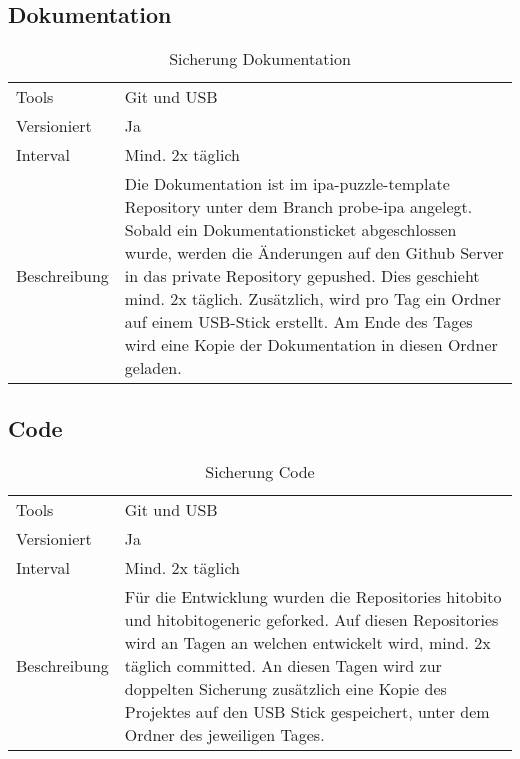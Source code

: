 \subsection{Dokumentation}
\begin{table}[h!]
    \begin{tabular}{|L{0.4\textwidth}|L{0.5\textwidth}|}
        \hline
          \\[12pt]
        \hline
        Tools & Git und USB \\
        \hline
        Versioniert & Ja \\
        \hline
        Interval & Mind. 2x täglich \\
        \hline
        Beschreibung & Die Dokumentation ist im ipa-puzzle-template Repository unter dem Branch probe-ipa angelegt.
        Sobald ein Dokumentationsticket abgeschlossen wurde, werden die Änderungen auf den Github Server in das private Repository
        gepushed. Dies geschieht mind. 2x täglich. Zusätzlich, wird pro Tag ein Ordner auf einem USB-Stick erstellt.  Am Ende des Tages wird eine Kopie der Dokumentation
        in diesen Ordner geladen. \\
      \hline
      \end{tabular}
      \caption{Sicherung Dokumentation}
\end{table}

\newpage

\subsection{Code}
\begin{table}[h!]
    \begin{tabular}{|L{0.4\textwidth}|L{0.5\textwidth}|}
        \hline
          \\[12pt]
        \hline
        Tools & Git und USB \\
        \hline
        Versioniert & Ja \\
        \hline
        Interval & Mind. 2x täglich \\
        \hline
        Beschreibung & Für die Entwicklung wurden die Repositories hitobito und hitobito\-generic geforked.
        Auf diesen Repositories wird an Tagen an welchen entwickelt wird, mind. 2x täglich committed. An diesen Tagen
        wird zur doppelten Sicherung zusätzlich eine Kopie des Projektes auf den USB Stick gespeichert, unter dem Ordner des jeweiligen Tages. \\
      \hline
      \end{tabular}
      \caption{Sicherung Code}
\end{table}

